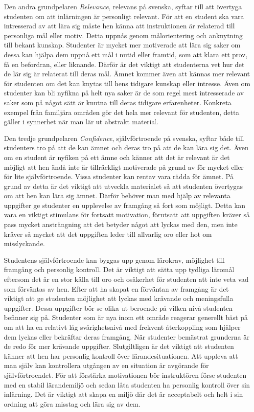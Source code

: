 \documentclass[]{article}
\begin{document}
Den andra grundpelaren \textit{Relevance}, relevans på svenska,
syftar till att övertyga studenten om att inlärningen är personligt relevant.
För att en student ska vara intresserad av att lära sig måste hen känna
att instruktionen är relaterad till personliga mål eller motiv.
Detta uppnås genom målorientering och anknytning till bekant kunskap.
Studenter är mycket mer motiverade att lära sig saker om dessa kan hjälpa dem
uppnå ett mål i nutid eller framtid, som att klara ett prov, få en befordran,
eller liknande. Därför är det viktigt att studenterna vet hur det de lär sig är
relaterat till deras mål. Ämnet kommer även att kännas mer relevant för studenten
om det kan knytas till hens tidigare kunskap eller intresse. Även om studenter kan
bli nyfikna på helt nya saker är de som regel mest intresserade av saker som på
något sätt är knutna till deras tidigare erfarenheter.
Konkreta exempel från familjära områden gör det hela mer relevant för studenten,
detta gäller i synnerhet när man lär ut abstrakt material.

Den tredje grundpelaren \textit{Confidence}, självförtroende på svenska,
syftar både till studenters tro på att de kan ämnet och deras tro på att
de kan lära sig det. Även om en student är nyfiken på ett ämne och känner
att det är relevant är det möjligt att hen ändå inte är tillräckligt
motiverade på grund av för mycket eller för lite självförtroende.
Vissa studenter kan rentav vara rädda för ämnet. På grund av detta är det
viktigt att utveckla materialet så att studenten övertygas om att hen kan
lära sig ämnet. Därför behöver man med hjälp av relevanta uppgifter ge studenter
en upplevelse av framgång så fort som möjligt. Detta kan vara en viktigt
stimulans för fortsatt motivation, förutsatt att uppgiften kräver så pass
mycket ansträngning att det betyder något att lyckas med den, men inte kräver
så mycket att det uppgiften leder till allvarlig oro eller hot om misslyckande.

Studentens självförtroende kan byggas upp genom lärokrav,
möjlighet till fram\-gång och personlig kontroll.
Det är viktigt att sätta upp tydliga läromål eftersom det är en stor
källa till oro och osäkerhet för studenten att inte veta vad som
förväntas av hen. Efter att ha skapat en förväntan av framgång är det
viktigt att ge studenten möjlighet att lyckas med krävande och
meningsfulla uppgifter. Dessa uppgifter bör se olika ut beroende på
vilken nivå studenten befinner sig på. Studenter som är nya inom ett område
reagerar generellt bäst på om att ha en relativt låg svårighetsnivå med frekvent
återkoppling som hjälper dem lyckas eller bekräftar deras framgång.
När studenter bemästrat grunderna är de redo för mer krävande uppgifter.
Slutgiltligen är det viktigt att studenten känner att hen har personlig
kontroll över lärandesituationen. Att uppleva att man själv kan
kontrollera utgången av en situation är avgörande för självförtroendet.
För att förstärka motivationen bör instruktören förse studenten med en
stabil lärandemiljö och sedan låta studenten ha personlig kontroll över sin
inlärning. Det är viktigt att skapa en miljö där det är acceptabelt och helt
i sin ordning att göra misstag och lära sig av dem.
\end{document}
